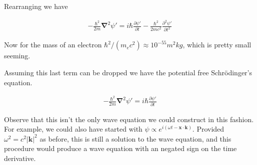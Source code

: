 \documentclass[]{eliblog}
\newcommand{\Abs}[1]{{\left\lvert{#1}\right\rvert}}
\newcommand{\Bk}[0]{\mathbf{k}}
\newcommand{\Bx}[0]{\mathbf{x}}
\newcommand{\spacegrad}[0]{\boldsymbol{\nabla}}
\begin{document}
Rearranging we have 

\begin{align}
-\frac{\hbar^2}{2m} \spacegrad^2 \psi' = i \hbar \frac{\partial \psi'}{\partial t} -\frac{\hbar^2}{2m c^2} \frac{\partial^2 \psi'}{\partial t^2} 
\end{align}

Now for the mass of an electron $\hbar^2/(m_e c^2) \approx 10^{-55} m^2 kg$, which is pretty small seeming.

Assuming this last term can be dropped we have the potential free Schr\"{o}dinger's equation.

\begin{align}
-\frac{\hbar^2}{2m} \spacegrad^2 \psi' = i \hbar \frac{\partial \psi'}{\partial t}
\end{align}

Observe that 
this isn't the only wave equation we could construct in this fashion.  For example, we could also have started with $\psi \propto e^{i(\omega t - \Bx \cdot \Bk)}$.  Provided $\omega^2 = c^2 \Abs{\Bk}^2$ as before, this is still a solution to the wave equation, and this procedure would produce a wave equation 
with an negated sign on the time derivative.



\end{document}
